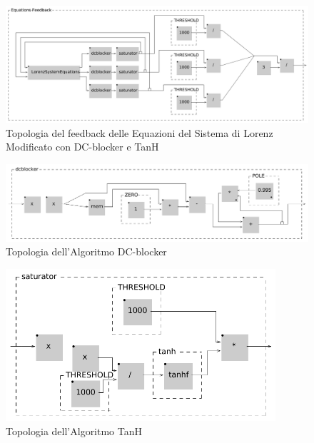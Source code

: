 \begin{figure}[h!]
\begin{center}
    \includegraphics[width=14cm]{figures/LorenzSystemFB2.pdf}
    \caption{Topologia del feedback delle Equazioni del Sistema di Lorenz Modificato con DC-blocker e TanH}  
\end{center}
\vspace{0.5cm}
\end{figure}

\begin{figure}[h!] 
\begin{center}
    \includegraphics[width=14cm]{figures/DCblocker.pdf}
    \caption{Topologia dell'Algoritmo DC-blocker} 
\end{center}
\vspace{0.5cm}
\end{figure}
\clearpage

\begin{figure}[h!] 
\begin{center}
    \includegraphics[width=10cm]{figures/Saturator.pdf}
    \caption{Topologia dell'Algoritmo TanH} 
\end{center}
\vspace{0.5cm}
\end{figure}


